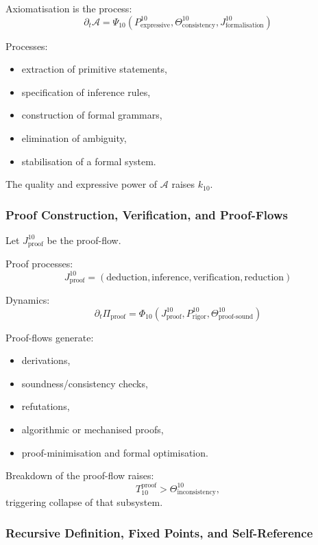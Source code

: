 Axiomatisation is the process:
\[
\partial_t \mathcal{A}
= \Psi_{10}(P^{10}_{\text{expressive}},
            \Theta^{10}_{\text{consistency}},
            J^{10}_{\text{formalisation}})
\]

Processes:
\begin{itemize}
    \item extraction of primitive statements,
    \item specification of inference rules,
    \item construction of formal grammars,
    \item elimination of ambiguity,
    \item stabilisation of a formal system.
\end{itemize}

The quality and expressive power of $\mathcal{A}$ raises $k_{10}$.

\subsubsection{Proof Construction, Verification, and Proof-Flows}

Let $J^{10}_{\text{proof}}$ be the proof-flow.

Proof processes:
\[
J^{10}_{\text{proof}} =
(\text{deduction}, \text{inference}, \text{verification}, \text{reduction})
\]

Dynamics:
\[
\partial_t \Pi_{\text{proof}}
= \Phi_{10}(J^{10}_{\text{proof}},
            P^{10}_{\text{rigor}},
            \Theta^{10}_{\text{proof-sound}})
\]

Proof-flows generate:
\begin{itemize}
    \item derivations,
    \item soundness/consistency checks,
    \item refutations,
    \item algorithmic or mechanised proofs,
    \item proof-minimisation and formal optimisation.
\end{itemize}

Breakdown of the proof-flow raises:
\[
T_{10}^{\text{proof}} > \Theta^{10}_{\text{inconsistency}},
\]
triggering collapse of that subsystem.

\subsubsection{Recursive Definition, Fixed Points, and Self-Reference}

